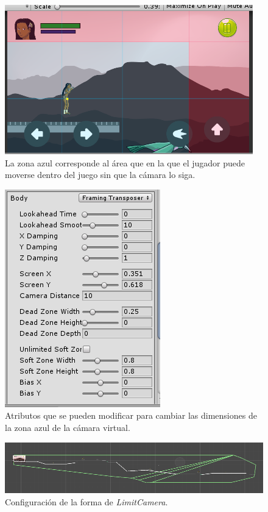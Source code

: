 \begin{figure}[h]
        \centering
        \includegraphics[height=0.2 \textheight]{03TrabajoRealizado/imagenes/cinemachine0003.png}
        \caption{La zona azul corresponde al área que en la que el jugador puede moverse dentro del juego sin que la cámara lo siga.}
        \label{fig:CameraZones}
\end{figure}

\begin{figure}[h]
        \centering
        \includegraphics[height=0.2 \textheight]{03TrabajoRealizado/imagenes/cinemachine0004.png}
        \caption{Atributos que se pueden modificar para cambiar las dimensiones de la zona azul de la cámara virtual.}
        \label{fig:CameraAttibutes}
\end{figure}

\begin{figure}[h]
        \centering
        \includegraphics[height=0.1 \textheight]{03TrabajoRealizado/imagenes/cinemachine0005.png}
        \caption{Configuración de la forma de \textit{LimitCamera}.}
        \label{fig:CameraLimit}
\end{figure}


